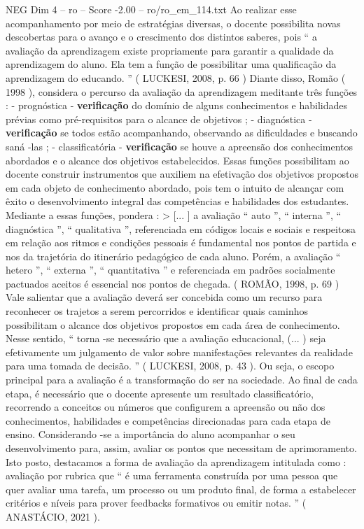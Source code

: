 \begin{textsample}{NEG Dim 4 – ro – Score -2.00 – ro/ro\_em\_114.txt}
Ao realizar esse acompanhamento por meio de estratégias diversas, o docente possibilita novas descobertas para o avanço e o crescimento dos distintos saberes, pois “ a avaliação da aprendizagem existe propriamente para garantir a qualidade da aprendizagem do aluno.
Ela tem a função de possibilitar uma qualificação da aprendizagem do educando. ” ( LUCKESI, 2008, p. 66 ) Diante disso, Romão ( 1998 ), considera o percurso da avaliação da aprendizagem meditante três funções : - prognóstica - \textbf{verificação} do domínio de alguns conhecimentos e habilidades prévias como pré-requisitos para o alcance de objetivos ; - diagnóstica - \textbf{verificação} se todos estão acompanhando, observando as dificuldades e buscando saná -las ; - classificatória - \textbf{verificação} se houve a apreensão dos conhecimentos abordados e o alcance dos objetivos estabelecidos.
Essas funções possibilitam ao docente construir instrumentos que auxiliem na efetivação dos objetivos propostos em cada objeto de conhecimento abordado, pois tem o intuito de alcançar com êxito o desenvolvimento integral das competências e habilidades dos estudantes.
Mediante a essas funções, pondera : > [... ] a avaliação “ auto ”, “ interna ”, “ diagnóstica ”, “ qualitativa ”, referenciada em códigos locais e sociais e respeitosa em relação aos ritmos e condições pessoais é fundamental nos pontos de partida e nos da trajetória do itinerário pedagógico de cada aluno.
Porém, a avaliação “ hetero ”, “ externa ”, “ quantitativa ” e referenciada em padrões socialmente pactuados aceitos é essencial nos pontos de chegada. ( ROMÃO, 1998, p. 69 ) Vale salientar que a avaliação deverá ser concebida como um recurso para reconhecer os trajetos a serem percorridos e identificar quais caminhos possibilitam o alcance dos objetivos propostos em cada área de conhecimento.
Nesse sentido, “ torna -se necessário que a avaliação educacional, (... ) seja efetivamente um julgamento de valor sobre manifestações relevantes da realidade para uma tomada de decisão. ” ( LUCKESI, 2008, p. 43 ).
Ou seja, o escopo principal para a avaliação é a transformação do ser na sociedade.
Ao final de cada etapa, é necessário que o docente apresente um resultado classificatório, recorrendo a conceitos ou números que configurem a apreensão ou não dos conhecimentos, habilidades e competências direcionadas para cada etapa de ensino.
Considerando -se a importância do aluno acompanhar o seu desenvolvimento para, assim, avaliar os pontos que necessitam de aprimoramento.
Isto posto, destacamos a forma de avaliação da aprendizagem intitulada como : avaliação por rubrica que “ é uma ferramenta construída por uma pessoa que quer avaliar uma tarefa, um processo ou um produto final, de forma a estabelecer critérios e níveis para prover feedbacks formativos ou emitir notas. ” ( ANASTÁCIO, 2021 ).

\end{textsample}
